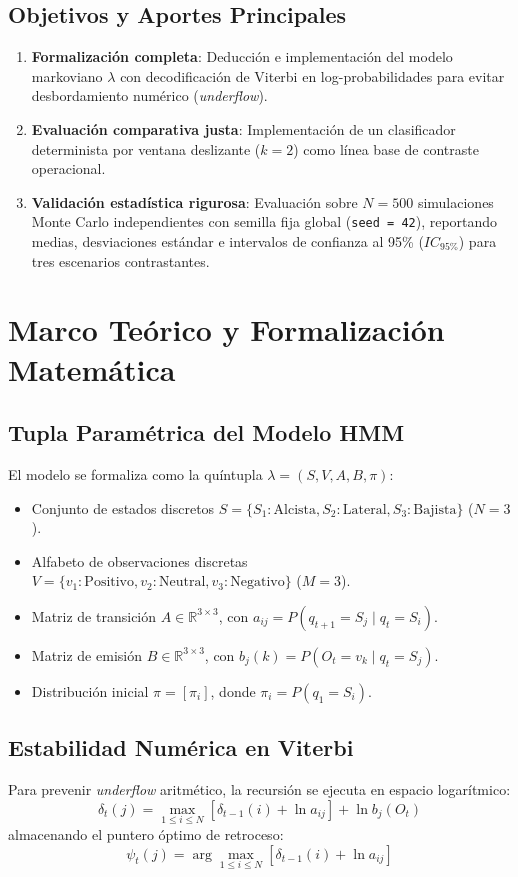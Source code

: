 \documentclass[conference,10pt,twocolumn]{IEEEtran}
\begin{document}
\subsection{Objetivos y Aportes Principales}
\begin{enumerate}
    \item \textbf{Formalización completa}: Deducción e implementación del modelo markoviano $\lambda$ con decodificación de Viterbi en log-probabilidades para evitar desbordamiento numérico (\textit{underflow}).
    \item \textbf{Evaluación comparativa justa}: Implementación de un clasificador determinista por ventana deslizante ($k=2$) como línea base de contraste operacional.
    \item \textbf{Validación estadística rigurosa}: Evaluación sobre $N=500$ simulaciones Monte Carlo independientes con semilla fija global (\texttt{seed = 42}), reportando medias, desviaciones estándar e intervalos de confianza al 95\% ($IC_{95\%}$) para tres escenarios contrastantes.
\end{enumerate}

\section{Marco Teórico y Formalización Matemática}

\subsection{Tupla Paramétrica del Modelo HMM}
El modelo se formaliza como la quíntupla $\lambda = (S, V, A, B, \pi)$:
\begin{itemize}
    \item Conjunto de estados discretos $S = \{S_1: \text{Alcista}, S_2: \text{Lateral}, S_3: \text{Bajista}\}$ ($N=3$).
    \item Alfabeto de observaciones discretas $V = \{v_1: \text{Positivo}, v_2: \text{Neutral}, v_3: \text{Negativo}\}$ ($M=3$).
    \item Matriz de transición $A \in \mathbb{R}^{3 \times 3}$, con $a_{ij} = P(q_{t+1}=S_j \mid q_t=S_i)$.
    \item Matriz de emisión $B \in \mathbb{R}^{3 \times 3}$, con $b_j(k) = P(O_t=v_k \mid q_t=S_j)$.
    \item Distribución inicial $\pi = [\pi_i]$, donde $\pi_i = P(q_1=S_i)$.
\end{itemize}

\subsection{Estabilidad Numérica en Viterbi}
Para prevenir \textit{underflow} aritmético, la recursión se ejecuta en espacio logarítmico:
\begin{equation}
\delta_t(j) = \max_{1 \le i \le N} \left[ \delta_{t-1}(i) + \ln a_{ij} \right] + \ln b_j(O_t)
\end{equation}
almacenando el puntero óptimo de retroceso:
\begin{equation}
\psi_t(j) = \arg\max_{1 \le i \le N} \left[ \delta_{t-1}(i) + \ln a_{ij} \right]
\end{equation}
\end{document}
